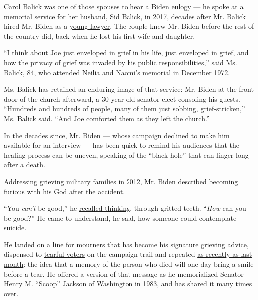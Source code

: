 Carol Balick was one of those spouses to hear a Biden eulogy --- he
\href{https://www.delawareonline.com/story/money/business/2017/06/21/sid-balick-giant-politics-and-law-remembered-thursday/413521001/}{spoke
at} a memorial service for her husband, Sid Balick, in 2017, decades
after Mr. Balick hired Mr. Biden as a
\href{https://www.balick.com/about-us/}{young lawyer}. The couple knew
Mr. Biden before the rest of the country did, back when he lost his
first wife and daughter.

``I think about Joe just enveloped in grief in his life, just enveloped
in grief, and how the privacy of grief was invaded by his public
responsibilities,'' said Ms. Balick, 84, who attended Neilia and Naomi's
memorial
\href{https://www.newspapers.com/image/?clipping_id=49364802\&fcfToken=eyJhbGciOiJIUzI1NiIsInR5cCI6IkpXVCJ9.eyJmcmVlLXZpZXctaWQiOjE1NDk1NTQxNywiaWF0IjoxNTkwNTM0NDUzLCJleHAiOjE1OTA2MjA4NTN9.iIQiBIe9RoHDWxgnh9rPtdeADSC8mH9YJG80KC9J748}{in
December 1972}.

Ms. Balick has retained an enduring image of that service: Mr. Biden at
the front door of the church afterward, a 30-year-old senator-elect
consoling his guests. ``Hundreds and hundreds of people, many of them
just sobbing, grief-stricken,'' Ms. Balick said. ``And Joe comforted
them as they left the church.''

In the decades since, Mr. Biden --- whose campaign declined to make him
available for an interview --- has been quick to remind his audiences
that the healing process can be uneven, speaking of the ``black hole''
that can linger long after a death.

Addressing grieving military families in 2012, Mr. Biden described
becoming furious with his God after the accident.

``You \emph{can't} be good,'' he
\href{https://www.youtube.com/watch?v=GwZ6UfXm410}{recalled thinking},
through gritted teeth. ``\emph{How} can you be good?'' He came to
understand, he said, how someone could contemplate suicide.

He landed on a line for mourners that has become his signature grieving
advice, dispensed to
\href{https://www.nytimes.com/2019/05/30/us/politics/joe-biden-beau-biden-death.html}{tearful
voters} on the campaign trail and repeated
\href{https://twitter.com/JoeBiden/status/1265757168504049664}{as
recently as last month}: the idea that a memory of the person who died
will one day bring a smile before a tear. He offered a version of that
message as he memorialized Senator
\href{https://www.nytimes.com/1983/09/03/obituaries/senator-henry-m-jackson-is-dead-at-71.html}{Henry
M. ``Scoop'' Jackson} of Washington in 1983, and has shared it many
times over.

